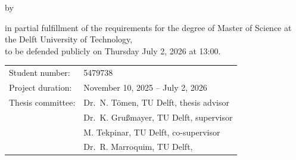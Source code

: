 \begin{titlepage}

\begin{center}

{\makeatletter
\largetitlestyle\fontsize{45}{45}\selectfont\@title
\makeatother}

{\makeatletter
\ifdefvoid{\@subtitle}{}{\bigskip\titlestyle\fontsize{20}{20}\selectfont\@subtitle}
\makeatother}

\bigskip
\bigskip

by

\bigskip
\bigskip

{\makeatletter
\largetitlestyle\fontsize{25}{25}\selectfont\@author
\makeatother}

\bigskip
\bigskip

\setlength\extrarowheight{2pt}

\vfill

in partial fulfillment of the requirements for the degree of
Master of Science
at the Delft University of Technology,\\
to be defended publicly on Thursday July 2, 2026 at 13:00.

\bigskip
\bigskip

\begin{tabular}{@{}ll}
    Student number:    & 5479738 \\[4pt]
    Project duration:  & November 10, 2025 -- July 2, 2026 \\[4pt]
    Thesis committee:  & Dr.\ N. Tömen, TU Delft, thesis advisor \\
                       & Dr.\ K. Gru{\ss}mayer, TU Delft, supervisor \\
                       & M. Tekpinar, TU Delft, co-supervisor \\
                       & Dr.\ R. Marroquim, TU Delft, \\
\end{tabular}

\bigskip
\bigskip



\end{center}
\end{titlepage}

